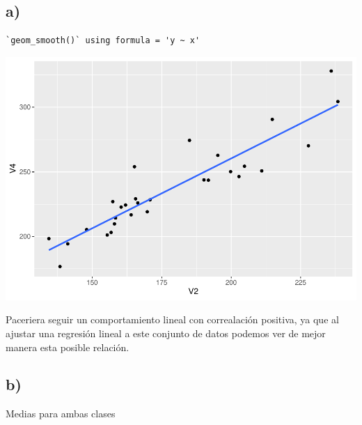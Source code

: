 \documentclass[
]{article}
\begin{document}
\hypertarget{a-6}{%
\subsection{a)}\label{a-6}}

\begin{verbatim}
`geom_smooth()` using formula = 'y ~ x'
\end{verbatim}

\includegraphics{Tarea1_files/figure-latex/pressure-1.pdf}

Paceriera seguir un comportamiento lineal con correalación positiva, ya
que al ajustar una regresión lineal a este conjunto de datos podemos ver
de mejor manera esta posible relación.

\hypertarget{b-6}{%
\subsection{b)}\label{b-6}}

Medias para ambas clases
\end{document}
